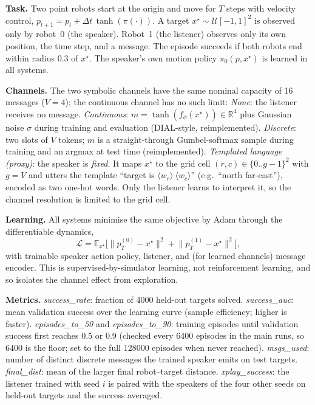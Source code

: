 \textbf{Task.} Two point robots start at the origin and move for $T$ steps with velocity control, $p_{t+1}=p_t+\Delta t\,\tanh(\pi(\cdot))$. A target $x^\star\sim\mathcal U[-1,1]^2$ is observed only by robot~0 (the speaker). Robot~1 (the listener) observes only its own position, the time step, and a message. The episode succeeds if both robots end within radius $0.3$ of $x^\star$. The speaker's own motion policy $\pi_0(p,x^\star)$ is learned in all systems.

\textbf{Channels.} The two symbolic channels have the same nominal capacity of 16 messages ($V{=}4$); the continuous channel has no such limit:
\emph{None}: the listener receives no message.
\emph{Continuous}: $m=\tanh(f_\phi(x^\star))\in\mathbb R^4$ plus Gaussian noise $\sigma$ during training and evaluation (DIAL-style, reimplemented).
\emph{Discrete}: two slots of $V$ tokens; $m$ is a straight-through Gumbel-softmax sample during training and an argmax at test time (reimplemented).
\emph{Templated language (proxy)}: the speaker is \emph{fixed}. It maps $x^\star$ to the grid cell $(r,c)\in\{0..g-1\}^2$ with $g=V$ and utters the template ``target is $\langle w_r\rangle\ \langle w_c\rangle$'' (e.g.\ ``north far-east''), encoded as two one-hot words. Only the listener learns to interpret it, so the channel resolution is limited to the grid cell.

\textbf{Learning.} All systems minimise the same objective by Adam through the differentiable dynamics,
\begin{equation}
\mathcal L=\mathbb E_{x^\star}\big[\lVert p^{(0)}_T-x^\star\rVert^2+\lVert p^{(1)}_T-x^\star\rVert^2\big],
\end{equation}
with trainable speaker action policy, listener, and (for learned channels) message encoder. This is supervised-by-simulator learning, not reinforcement learning, and so isolates the channel effect from exploration.

\textbf{Metrics.} \emph{success\_rate}: fraction of 4000 held-out targets solved. \emph{success\_auc}: mean validation success over the learning curve (sample efficiency; higher is faster). \emph{episodes\_to\_50} and \emph{episodes\_to\_90}: training episodes until validation success first reaches 0.5 or 0.9 (checked every 6400 episodes in the main runs, so 6400 is the floor; set to the full 128000 episodes when never reached). \emph{msgs\_used}: number of distinct discrete messages the trained speaker emits on test targets. \emph{final\_dist}: mean of the larger final robot--target distance. \emph{xplay\_success}: the listener trained with seed $i$ is paired with the speakers of the four other seeds on held-out targets and the success averaged.
